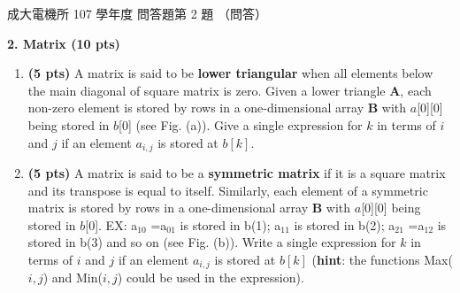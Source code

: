 \begin{pastexam}[label={px:ncku-107-ee-ds-06}]{成大電機所 107 學年度 問答題第 2 題}
（問答）

\textbf{2. Matrix (10 pts)}
\begin{enumerate}[label=\alph*.]
\item \textbf{(5 pts)} A matrix is said to be \textbf{lower triangular} when all elements below the
main diagonal of square matrix is zero. Given a lower triangle \textbf{A}, each non-zero element is
stored by rows in a one-dimensional array \textbf{B} with $a$[0][0] being stored in $b$[0] (see Fig.
(a)). Give a single expression for $k$ in terms of $i$ and $j$ if an element $a_{i,j}$ is stored at
$b[k]$.
\item \textbf{(5 pts)} A matrix is said to be a \textbf{symmetric matrix} if it is a square matrix and
its transpose is equal to itself. Similarly, each element of a symmetric matrix is stored by rows in
a one-dimensional array \textbf{B} with $a$[0][0] being stored in $b$[0]. EX: a$_{10}$ =a$_{01}$ is
stored in b(1); a$_{11}$ is stored in b(2); a$_{21}$ =a$_{12}$ is stored in b(3) and so on (see Fig.
(b)). Write a single expression for $k$ in terms of $i$ and $j$ if an element $a_{i,j}$ is stored at
$b[k]$ (\textbf{hint}: the functions Max($i,j$) and Min($i,j$) could be used in the expression).
\end{enumerate}
\begin{center}
\end{center}
\end{pastexam}


